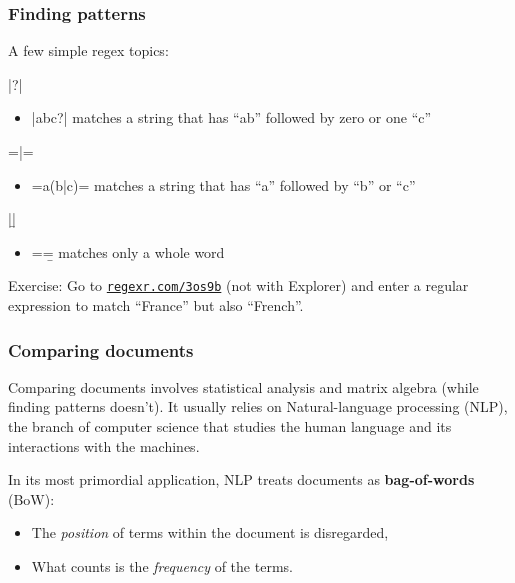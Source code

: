 \documentclass[serif, aspectratio=169]{beamer}
\begin{document}
\begin{frame}[fragile]
\frametitle{Finding patterns}

A few simple regex topics:

\begin{description}

\item<1->[Quantifier] \bverb|?|

\begin{itemize}

\item<2-> \bverb|abc?| matches a string that has \enquote{ab} followed by zero or one \enquote{c}

\end{itemize}

\item<3->[OR operator] \bverb=|=

\begin{itemize}

\item<4-> \bverb=a(b|c)= matches a string that has \enquote{a} followed by \enquote{b} or \enquote{c}

\end{itemize}

\item<5->[Boundaries]\bverb|\b|

\begin{itemize}

\item<6-> \bverb=\babc\b= matches only a whole word

\end{itemize}

\end{description}

{\footnotesize Exercise: Go to \texttt{\href{https://regexr.com/3os9b}{regexr.com/3os9b}} (not with Explorer) and enter a regular expression to match \enquote{France} but also \enquote{French}}.

\end{frame}

\begin{frame}
\frametitle{Comparing documents}

Comparing documents involves statistical analysis and matrix algebra (while finding patterns doesn't). It usually relies on Natural-language processing (NLP), the branch of computer science that studies the human language and its interactions with the machines. 

In its most primordial application, NLP treats documents as \textbf{bag-of-words} (BoW):
\begin{itemize}
\item  The \textit{position} of terms within the document is disregarded,
\item What counts is the \textit{frequency} of the terms.
\end{itemize}

\end{frame}
\end{document}
